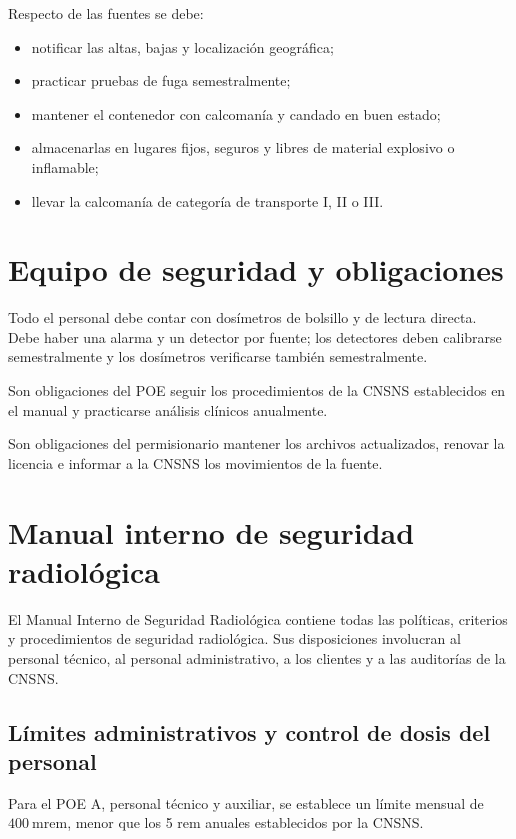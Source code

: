 Respecto de las fuentes se debe:
\begin{itemize}
  \item notificar las altas, bajas y localización geográfica;
  \item practicar pruebas de fuga semestralmente;
  \item mantener el contenedor con calcomanía y candado en buen estado;
  \item almacenarlas en lugares fijos, seguros y libres de material explosivo o inflamable;
  \item llevar la calcomanía de categoría de transporte I, II o III.
\end{itemize}

\section{Equipo de seguridad y obligaciones}

Todo el personal debe contar con dosímetros de bolsillo y de lectura directa. Debe haber una alarma y un detector por fuente; los detectores deben calibrarse semestralmente y los dosímetros verificarse también semestralmente.

Son obligaciones del POE seguir los procedimientos de la CNSNS establecidos en el manual y practicarse análisis clínicos anualmente.

Son obligaciones del permisionario mantener los archivos actualizados, renovar la licencia e informar a la CNSNS los movimientos de la fuente.

\section{Manual interno de seguridad radiológica}

El Manual Interno de Seguridad Radiológica contiene todas las políticas, criterios y procedimientos de seguridad radiológica. Sus disposiciones involucran al personal técnico, al personal administrativo, a los clientes y a las auditorías de la CNSNS.

\subsection{Límites administrativos y control de dosis del personal}

Para el POE A, personal técnico y auxiliar, se establece un límite mensual de $400\ \mathrm{mrem}$, menor que los 5 rem anuales establecidos por la CNSNS.

